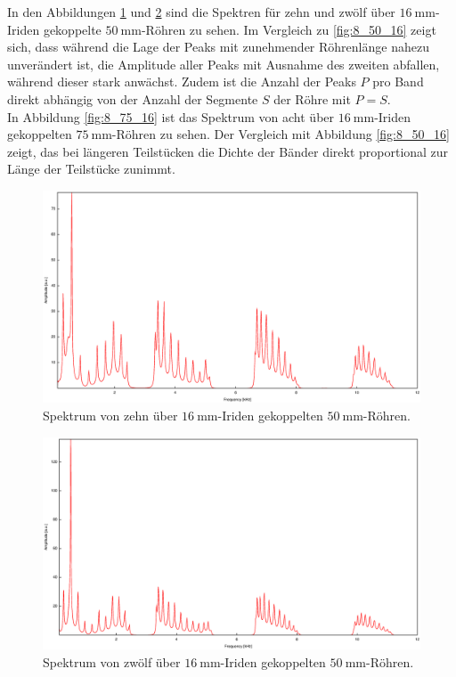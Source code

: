 \newpage
\noindent In den Abbildungen \ref{fig:10_50_16} und \ref{fig:12_50_16} sind die Spektren für zehn und zwölf über $\SI{16}{\milli\meter}$-Iriden gekoppelte $\SI{50}{\milli\meter}$-Röhren zu sehen. Im Vergleich zu \ref{fig:8_50_16} zeigt sich, dass während die Lage der Peaks  mit zunehmender Röhrenlänge nahezu unverändert ist, die Amplitude aller Peaks mit Ausnahme des zweiten abfallen, während dieser stark anwächst. Zudem ist die Anzahl der Peaks $P$ pro Band direkt abhängig von der Anzahl der Segmente $S$ der Röhre mit $P=S$.\\
In Abbildung \ref{fig:8_75_16} ist das Spektrum von acht über $\SI{16}{\milli\meter}$-Iriden gekoppelten $\SI{75}{\milli\meter}$-Röhren zu sehen. Der Vergleich mit Abbildung \ref{fig:8_50_16} zeigt, das bei längeren Teilstücken die Dichte der Bänder direkt proportional zur Länge der Teilstücke zunimmt.\\

\begin{figure}
\centering
\includegraphics[width=\linewidth-60pt,height=\textheight-60pt,keepaspectratio]{FP-V23data/4.4_500mm_16mm.eps}
\caption{Spektrum von zehn über $\SI{16}{\milli\meter}$-Iriden gekoppelten $\SI{50}{\milli\meter}$-Röhren.}
\label{fig:10_50_16}
\end{figure}

\begin{figure}
\centering
\includegraphics[width=\linewidth-60pt,height=\textheight-60pt,keepaspectratio]{FP-V23data/4.4_600mm_16mm.eps}
\caption{Spektrum von zwölf über $\SI{16}{\milli\meter}$-Iriden gekoppelten $\SI{50}{\milli\meter}$-Röhren.}
\label{fig:12_50_16}
\end{figure}

